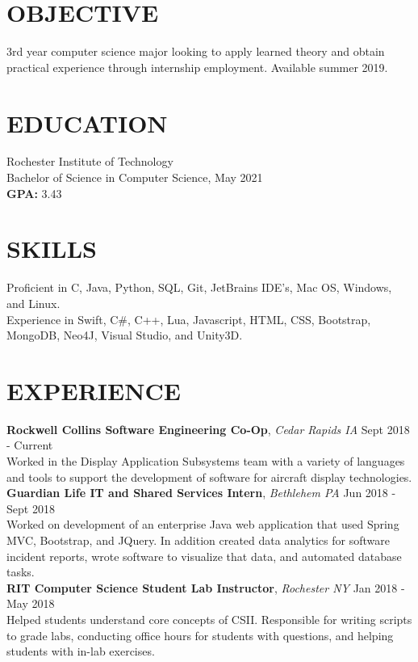 \documentclass[line, margin]{res}
\begin{document}
\address{(484) 554-8487\\ emp9173@rit.edu}

\begin{resume}

\setmainfont[
 BoldFont={Helvetica Neue Bold}, 
 ItalicFont={Helvetica Neue Italic},
 BoldItalicFont={Helvetica Neue Bold Italic}
 ]{Helvetica Neue}



\section{OBJECTIVE}
3rd year computer science major looking to apply learned theory and obtain practical experience through internship employment. Available summer 2019.

\section{EDUCATION} 
 Rochester Institute of Technology \\
 Bachelor of Science in Computer Science, May 2021\\
 \textbf{GPA:} 3.43
 
\section{SKILLS}
Proficient in C, Java, Python, SQL, Git, JetBrains IDE’s, Mac OS, Windows, and Linux. \\
Experience in Swift, C\#, C++, Lua, Javascript, HTML, CSS, Bootstrap, MongoDB, Neo4J, Visual Studio, and Unity3D.
 
\section{EXPERIENCE} 
\textbf{Rockwell Collins Software Engineering Co-Op}, \textit{Cedar Rapids IA} \hfill Sept 2018 - Current \\
Worked in the Display Application Subsystems team with a variety of languages and tools to support the development of software for aircraft display technologies.\\ [10pt]
\textbf{Guardian Life IT and Shared Services Intern}, \textit{Bethlehem PA} \hfill Jun 2018 - Sept 2018 \\
Worked on development of an enterprise Java web application that used Spring MVC, Bootstrap, and JQuery.  In addition created
data analytics for software incident reports, wrote software to visualize that data, and automated database tasks.\\ [10pt]
\textbf{RIT Computer Science Student Lab Instructor}, \textit{Rochester NY} \hfill Jan 2018 - May 2018 \\
Helped students understand core concepts of CSII. Responsible for writing scripts
to grade labs, conducting office hours for students with questions, and helping students
with in-lab exercises.


\end{resume}
\end{document}

